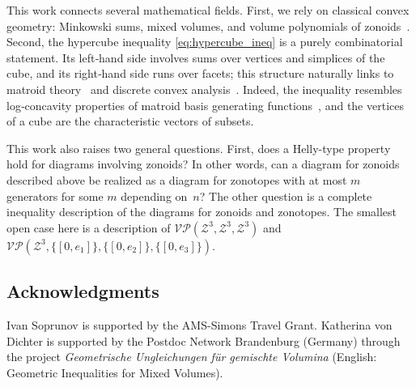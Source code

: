 \documentclass[11pt]{amsart}
\newcommand{\VP}{\mathcal{VP}}
\newcommand{\Z}{\mathcal Z}
\theoremstyle{definition}
\theoremstyle{remark}
\begin{document}


This work connects several mathematical fields. First, we rely on classical convex geometry: Minkowski sums, mixed volumes, and volume polynomials of zonoids~\cite{Sch}. Second, the hypercube inequality \eqref{eq:hypercube_ineq} is a purely combinatorial statement. Its left‑hand side involves sums over vertices and simplices of the cube, and its right‑hand side runs over facets; this structure naturally links to matroid theory~\cite{Ox} and discrete convex analysis~\cite{Mur}. Indeed, the inequality resembles log‑concavity properties of matroid basis generating functions~\cite{AH}, and the vertices of a cube are the characteristic vectors of subsets. 

This work also raises two general questions. First, does a Helly-type property hold for diagrams involving zonoids? In other words, can a 
diagram for zonoids described above be realized as a diagram for zonotopes with at most $m$ generators for some $m$ depending on~$n$? The other question is a complete inequality description of the diagrams for zonoids and zonotopes. The smallest open case here is a description of 
$\VP(\Z^3,\Z^3,\Z^3)$ and $\VP(\Z^3,\{[0,e_1]\},\{[0,e_2]\},\{[0,e_3]\})$.

\subsection*{Acknowledgments}  Ivan Soprunov is supported by the AMS-Simons Travel Grant. Katherina von Dichter is supported by the Postdoc Network Brandenburg (Germany) through the project \emph{Geometrische Ungleichungen für gemischte Volumina} (English: Geometric Inequalities for Mixed Volumes). 
\end{document}
